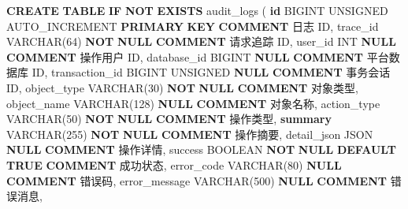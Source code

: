 \documentclass[
  a4paper,
  UTF8]{ctexart}
\newenvironment{Shaded}{}{}
\newcommand{\ControlFlowTok}[1]{\textcolor[rgb]{0.00,0.44,0.13}{\textbf{#1}}}
\newcommand{\DataTypeTok}[1]{\textcolor[rgb]{0.56,0.13,0.00}{#1}}
\newcommand{\DecValTok}[1]{\textcolor[rgb]{0.25,0.63,0.44}{#1}}
\newcommand{\KeywordTok}[1]{\textcolor[rgb]{0.00,0.44,0.13}{\textbf{#1}}}
\newcommand{\NormalTok}[1]{#1}
\newcommand{\StringTok}[1]{\textcolor[rgb]{0.25,0.44,0.63}{#1}}
\begin{document}
\begin{Shaded}
\begin{Highlighting}[]
\KeywordTok{CREATE} \KeywordTok{TABLE} \ControlFlowTok{IF} \KeywordTok{NOT} \KeywordTok{EXISTS}\NormalTok{ audit\_logs (}
  \KeywordTok{id}\NormalTok{ BIGINT UNSIGNED AUTO\_INCREMENT }\KeywordTok{PRIMARY} \KeywordTok{KEY} \KeywordTok{COMMENT} \StringTok{\textquotesingle{}日志 ID\textquotesingle{}}\NormalTok{,}
\NormalTok{  trace\_id }\DataTypeTok{VARCHAR}\NormalTok{(}\DecValTok{64}\NormalTok{) }\KeywordTok{NOT} \KeywordTok{NULL} \KeywordTok{COMMENT} \StringTok{\textquotesingle{}请求追踪 ID\textquotesingle{}}\NormalTok{,}
\NormalTok{  user\_id }\DataTypeTok{INT} \KeywordTok{NULL} \KeywordTok{COMMENT} \StringTok{\textquotesingle{}操作用户 ID\textquotesingle{}}\NormalTok{,}
\NormalTok{  database\_id BIGINT }\KeywordTok{NULL} \KeywordTok{COMMENT} \StringTok{\textquotesingle{}平台数据库 ID\textquotesingle{}}\NormalTok{,}
\NormalTok{  transaction\_id BIGINT UNSIGNED }\KeywordTok{NULL} \KeywordTok{COMMENT} \StringTok{\textquotesingle{}事务会话 ID\textquotesingle{}}\NormalTok{,}
\NormalTok{  object\_type }\DataTypeTok{VARCHAR}\NormalTok{(}\DecValTok{30}\NormalTok{) }\KeywordTok{NOT} \KeywordTok{NULL} \KeywordTok{COMMENT} \StringTok{\textquotesingle{}对象类型\textquotesingle{}}\NormalTok{,}
\NormalTok{  object\_name }\DataTypeTok{VARCHAR}\NormalTok{(}\DecValTok{128}\NormalTok{) }\KeywordTok{NULL} \KeywordTok{COMMENT} \StringTok{\textquotesingle{}对象名称\textquotesingle{}}\NormalTok{,}
\NormalTok{  action\_type }\DataTypeTok{VARCHAR}\NormalTok{(}\DecValTok{50}\NormalTok{) }\KeywordTok{NOT} \KeywordTok{NULL} \KeywordTok{COMMENT} \StringTok{\textquotesingle{}操作类型\textquotesingle{}}\NormalTok{,}
  \KeywordTok{summary} \DataTypeTok{VARCHAR}\NormalTok{(}\DecValTok{255}\NormalTok{) }\KeywordTok{NOT} \KeywordTok{NULL} \KeywordTok{COMMENT} \StringTok{\textquotesingle{}操作摘要\textquotesingle{}}\NormalTok{,}
\NormalTok{  detail\_json JSON }\KeywordTok{NULL} \KeywordTok{COMMENT} \StringTok{\textquotesingle{}操作详情\textquotesingle{}}\NormalTok{,}
\NormalTok{  success }\DataTypeTok{BOOLEAN} \KeywordTok{NOT} \KeywordTok{NULL} \KeywordTok{DEFAULT} \KeywordTok{TRUE} \KeywordTok{COMMENT} \StringTok{\textquotesingle{}成功状态\textquotesingle{}}\NormalTok{,}
\NormalTok{  error\_code }\DataTypeTok{VARCHAR}\NormalTok{(}\DecValTok{80}\NormalTok{) }\KeywordTok{NULL} \KeywordTok{COMMENT} \StringTok{\textquotesingle{}错误码\textquotesingle{}}\NormalTok{,}
\NormalTok{  error\_message }\DataTypeTok{VARCHAR}\NormalTok{(}\DecValTok{500}\NormalTok{) }\KeywordTok{NULL} \KeywordTok{COMMENT} \StringTok{\textquotesingle{}错误消息\textquotesingle{}}\NormalTok{,}

\end{Highlighting}
\end{Shaded}
\end{document}
